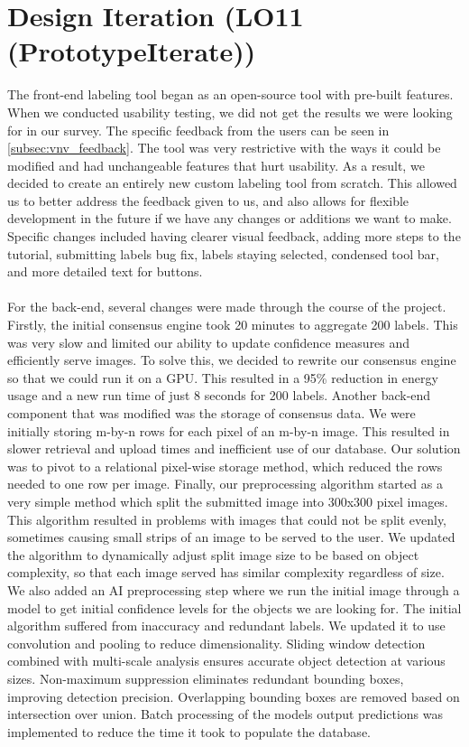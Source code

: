 \documentclass{article}
\begin{document}
\section{Design Iteration (LO11 (PrototypeIterate))}
 The front-end labeling tool began as an open-source tool with pre-built features. When we conducted usability testing, we did not get the results we were looking for in our survey. The specific feedback from the users can be seen in \ref{subsec:vnv_feedback}. The tool was very restrictive with the ways it could be modified and had unchangeable features that hurt usability. As a result, we decided to create an entirely new custom labeling tool from scratch. This allowed us to better address the feedback given to us, and also allows for flexible development in the future if we have any changes or additions we want to make. Specific changes included having clearer visual feedback, adding more steps to the tutorial, submitting labels bug fix, labels staying selected, condensed tool bar, and more detailed text for buttons.
 \\\\
 For the back-end, several changes were made through the course of the project. Firstly, the initial consensus engine took 20 minutes to aggregate 200 labels. This was very slow and limited our ability to update confidence measures and efficiently serve images. To solve this, we decided to rewrite our consensus engine so that we could run it on a GPU. This resulted in a 95\% reduction in energy usage and a new run time of just 8 seconds for 200 labels. Another back-end component that was modified was the storage of consensus data. We were initially storing m-by-n rows for each pixel of an m-by-n image. This resulted in slower retrieval and upload times and inefficient use of our database. Our solution was to pivot to a relational pixel-wise storage method, which reduced the rows needed to one row per image. Finally, our preprocessing algorithm started as a very simple method which split the submitted image into 300x300 pixel images. This algorithm resulted in problems with images that could not be split evenly, sometimes causing small strips of an image to be served to the user. We updated the algorithm to dynamically adjust split image size to be based on object complexity, so that each image served has similar complexity regardless of size. We also added an AI preprocessing step where we run the initial image through a model to get initial confidence levels for the objects we are looking for. The initial algorithm suffered from inaccuracy and redundant labels. We updated it to use convolution and pooling to reduce dimensionality. Sliding window detection combined with multi-scale analysis ensures accurate object detection at various sizes. Non-maximum suppression eliminates redundant bounding boxes, improving detection precision. Overlapping bounding boxes are removed based on intersection over union. Batch processing of the models output predictions was implemented to reduce the time it took to populate the database.
\end{document}
